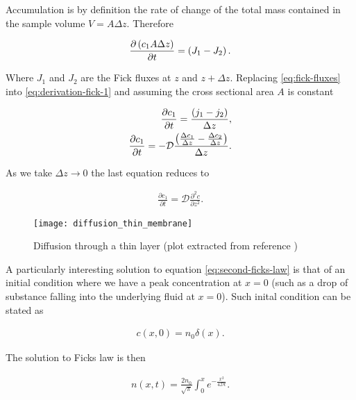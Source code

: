 Accumulation is by definition the rate of change of the total mass contained in the sample volume $V = A\Delta z$. Therefore

\begin{align}
	\label{eq:derivation-fick-1}
	\frac{\partial \left({c_1 A\Delta z}\right)}{\partial t} = \left({J_1 - J_2}\right).
\end{align}

Where $J_1$ and $J_2$ are the Fick fluxes at $z$ and $z+\Delta z$. Replacing \ref{eq:fick-fluxes} into \ref{eq:derivation-fick-1} and assuming the cross sectional area $A$ is constant

\begin{align}
	\frac{\partial c_1}{\partial t} = \frac{\left({j_1 - j_2}\right)}{\Delta z},\\
	\frac{\partial c_1}{\partial t} = -\mathcal{D}\frac{\left({\frac{\Delta c_1}{\Delta z} - \frac{\Delta c_2}{\Delta z}}\right)}{\Delta z}.
\end{align}

As we take $\Delta z \rightarrow 0$ the last equation reduces to

\begin{align}
\label{eq:second-ficks-law}
	\frac{\partial c_1}{\partial t} = \mathcal{D}\frac{\partial^2 c}{\partial z^2}.
\end{align}

\begin{figure}[h!]
\centering
	\texttt{[image: diffusion\_thin\_membrane]}
	\caption{Diffusion through a thin layer (plot extracted from reference \cite{cussler})}
\label{fig:cussler_thin_layer}
\end{figure}




A particularly interesting solution to equation \ref{eq:second-ficks-law} is that of an initial condition where we have a peak concentration at $x=0$ (such as a drop of substance falling into the underlying fluid at $x=0$). Such inital condition can be stated as

\begin{align}
	c(x,0) = n_0 \delta(x).
\end{align}

The solution to Ficks law is then

\begin{align}
	\label{eq:solution-fick}
	n(x,t) = \frac{2n_0}{\sqrt{\pi}}\int_0^x e^{-\frac{x^2}{4\mathcal{D}t}}.
\end{align}






